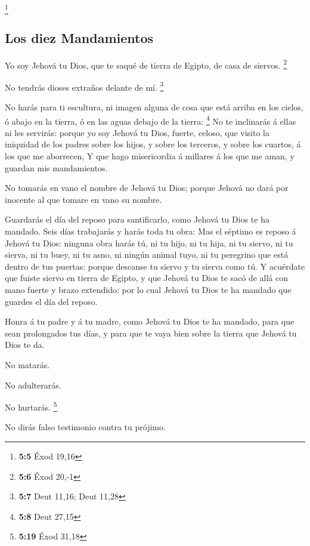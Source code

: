 \footnote{\textbf{5:5} Éxod 19,16}

\hypertarget{los-diez-mandamientos}{%
\subsection{Los diez Mandamientos}\label{los-diez-mandamientos}}

 Yo soy Jehová tu Dios, que te saqué de tierra de Egipto, de
casa de siervos. \footnote{\textbf{5:6} Éxod 20,-1}

 No tendrás dioses extraños delante de mí. \footnote{\textbf{5:7}
  Deut 11,16; Deut 11,28}

 No harás para ti escultura, ni imagen alguna de cosa que
está arriba en los cielos, ó abajo en la tierra, ó en las aguas debajo
de la tierra: \footnote{\textbf{5:8} Deut 27,15}  No te
inclinarás á ellas ni les servirás: porque yo soy Jehová tu Dios,
fuerte, celoso, que visito la iniquidad de los padres sobre los hijos, y
sobre los terceros, y sobre los cuartos, á los que me aborrecen,
 Y que hago misericordia á millares á los que me aman, y
guardan mis mandamientos.

 No tomarás en vano el nombre de Jehová tu Dios; porque
Jehová no dará por inocente al que tomare en vano su nombre.

 Guardarás el día del reposo para santificarlo, como Jehová
tu Dios te ha mandado.  Seis días trabajarás y harás toda
tu obra:  Mas el séptimo es reposo á Jehová tu Dios:
ninguna obra harás tú, ni tu hijo, ni tu hija, ni tu siervo, ni tu
sierva, ni tu buey, ni tu asno, ni ningún animal tuyo, ni tu peregrino
que está dentro de tus puertas: porque descanse tu siervo y tu sierva
como tú.  Y acuérdate que fuiste siervo en tierra de
Egipto, y que Jehová tu Dios te sacó de allá con mano fuerte y brazo
extendido: por lo cual Jehová tu Dios te ha mandado que guardes el día
del reposo.

 Honra á tu padre y á tu madre, como Jehová tu Dios te ha
mandado, para que sean prolongados tus días, y para que te vaya bien
sobre la tierra que Jehová tu Dios te da.

 No matarás.

 No adulterarás.

 No hurtarás. \footnote{\textbf{5:19} Éxod 31,18}

 No dirás falso testimonio contra tu prójimo.

